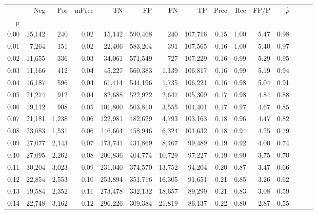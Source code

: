 \begin{tabular}{rrrrrrrrrrrrrrr}
\toprule
{} &     Neg &    Pos & mPrec &       TN &       FP &       FN &       TP &  Prec &   Rec &  FP/P & $\hat{p}$ \\
p    &         &        &       &          &          &          &          &       &       &       &           \\
\midrule
0.00 &  15,142 &    240 &  0.02 &   15,142 &  590,468 &      240 &  107,716 &  0.15 &  1.00 &  5.47 &      0.98 \\
0.01 &   7,264 &    151 &  0.02 &   22,406 &  583,204 &      391 &  107,565 &  0.16 &  1.00 &  5.40 &      0.97 \\
0.02 &  11,655 &    336 &  0.03 &   34,061 &  571,549 &      727 &  107,229 &  0.16 &  0.99 &  5.29 &      0.95 \\
0.03 &  11,166 &    412 &  0.04 &   45,227 &  560,383 &    1,139 &  106,817 &  0.16 &  0.99 &  5.19 &      0.94 \\
0.04 &  16,187 &    596 &  0.04 &   61,414 &  544,196 &    1,735 &  106,221 &  0.16 &  0.98 &  5.04 &      0.91 \\
0.05 &  21,274 &    912 &  0.04 &   82,688 &  522,922 &    2,647 &  105,309 &  0.17 &  0.98 &  4.84 &      0.88 \\
0.06 &  19,112 &    908 &  0.05 &  101,800 &  503,810 &    3,555 &  104,401 &  0.17 &  0.97 &  4.67 &      0.85 \\
0.07 &  21,181 &  1,238 &  0.06 &  122,981 &  482,629 &    4,793 &  103,163 &  0.18 &  0.96 &  4.47 &      0.82 \\
0.08 &  23,683 &  1,531 &  0.06 &  146,664 &  458,946 &    6,324 &  101,632 &  0.18 &  0.94 &  4.25 &      0.79 \\
0.09 &  27,077 &  2,143 &  0.07 &  173,741 &  431,869 &    8,467 &   99,489 &  0.19 &  0.92 &  4.00 &      0.74 \\
0.10 &  27,095 &  2,262 &  0.08 &  200,836 &  404,774 &   10,729 &   97,227 &  0.19 &  0.90 &  3.75 &      0.70 \\
0.11 &  30,204 &  3,023 &  0.09 &  231,040 &  374,570 &   13,752 &   94,204 &  0.20 &  0.87 &  3.47 &      0.66 \\
0.12 &  22,854 &  2,553 &  0.10 &  253,894 &  351,716 &   16,305 &   91,651 &  0.21 &  0.85 &  3.26 &      0.62 \\
0.13 &  19,584 &  2,352 &  0.11 &  273,478 &  332,132 &   18,657 &   89,299 &  0.21 &  0.83 &  3.08 &      0.59 \\
0.14 &  22,748 &  3,162 &  0.12 &  296,226 &  309,384 &   21,819 &   86,137 &  0.22 &  0.80 &  2.87 &      0.55 \\

\end{tabular}
